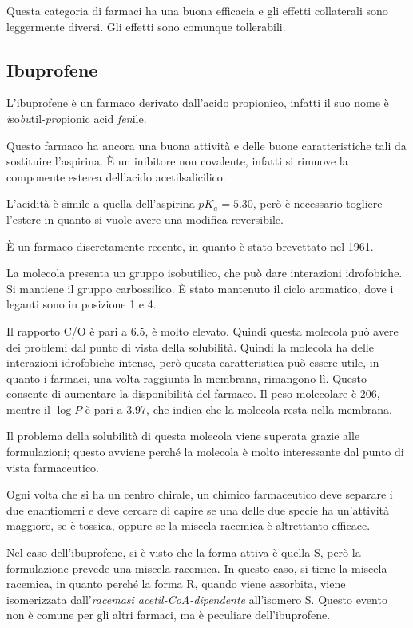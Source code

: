 
Questa categoria di farmaci ha una buona efficacia e gli effetti
collaterali sono leggermente diversi. Gli effetti sono comunque
tollerabili.

\subsection{Ibuprofene}

L'ibuprofene è un farmaco derivato dall'acido propionico, infatti il
suo nome è \emph{i}so\emph{bu}til-\emph{pro}pionic acid \emph{fen}ile.


Questo farmaco ha ancora una buona attività e delle buone
caratteristiche tali da sostituire l'aspirina. È un inibitore non
covalente, infatti si rimuove la componente esterea dell'acido
acetilsalicilico.

L'acidità è simile a quella dell'aspirina \(pK_a = 5.30\), però è
necessario togliere l'estere in quanto si vuole avere una modifica
reversibile.

È un farmaco discretamente recente, in quanto è stato brevettato nel
1961.

La molecola presenta un gruppo isobutilico, che può dare interazioni
idrofobiche. Si mantiene il gruppo carbossilico. È stato mantenuto il
ciclo aromatico, dove i leganti sono in posizione 1 e 4.

Il rapporto C/O è pari a 6.5, è molto elevato. Quindi questa molecola
può avere dei problemi dal punto di vista della solubilità. Quindi la
molecola ha delle interazioni idrofobiche intense, però questa
caratteristica può essere utile, in quanto i farmaci, una volta
raggiunta la membrana, rimangono lì. Questo consente di aumentare la
disponibilità del farmaco. Il peso molecolare è 206, mentre il
\(\log{} P\) è pari a 3.97, che indica che la molecola resta nella
membrana.

Il problema della solubilità di questa molecola viene superata grazie
alle formulazioni; questo avviene perché la molecola è molto
interessante dal punto di vista farmaceutico.

Ogni volta che si ha un centro chirale, un chimico farmaceutico deve
separare i due enantiomeri e deve cercare di capire se una delle due
specie ha un'attività maggiore, se è tossica, oppure se la miscela
racemica è altrettanto efficace.

Nel caso dell'ibuprofene, si è visto che la forma attiva è quella S,
però la formulazione prevede una miscela racemica. In questo caso, si
tiene la miscela racemica, in quanto perché la forma R, quando viene
assorbita, viene isomerizzata dall'\emph{racemasi acetil-CoA-dipendente}
all'isomero S. Questo evento non è comune per gli altri farmaci, ma è
peculiare dell'ibuprofene.


